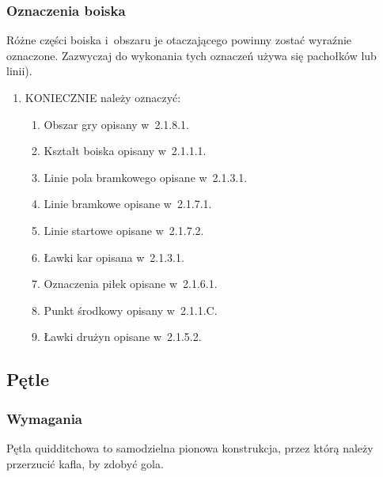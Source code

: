 \documentclass[12pt,a4paper]{article}
\begin{document}
\subsubsection{Oznaczenia boiska}

Różne części boiska i~obszaru je otaczającego powinny zostać wyraźnie
oznaczone. Zazwyczaj do wykonania tych oznaczeń używa się pachołków lub
linii).

\begin{enumerate}
	\item
	      KONIECZNIE należy oznaczyć:

	      \begin{enumerate}
		      \item Obszar gry opisany w~2.1.8.1.
		      \item Kształt boiska opisany w~2.1.1.1.
		      \item Linie pola bramkowego opisane w~2.1.3.1.
			\item Linie bramkowe opisane w~2.1.7.1.
			\item Linie startowe opisane w~2.1.7.2.
			\item Ławki kar opisana w~2.1.3.1.
			\item Oznaczenia piłek opisane w~2.1.6.1.
			\item Punkt środkowy opisany w~2.1.1.C.
			\item Ławki drużyn opisane w~2.1.5.2.
	      \end{enumerate}
\end{enumerate}

\subsection{Pętle}

\subsubsection{Wymagania}
Pętla quidditchowa to samodzielna pionowa
konstrukcja, przez którą należy przerzucić kafla, by zdobyć gola.
\end{document}
